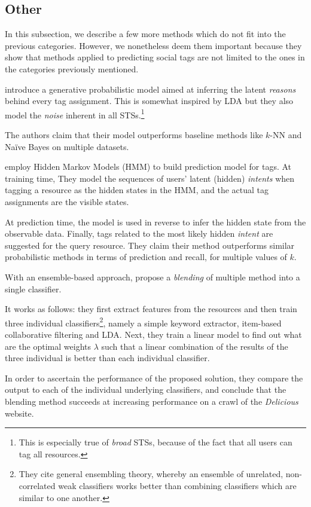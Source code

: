 \subsection{Other}

In this subsection, we describe a few more methods which do not fit into the previous categories. However, we nonetheless deem them important because they show that methods applied to predicting social tags are not limited to the ones in the categories previously mentioned. 

\cite{si_sun_2010} introduce a generative probabilistic model aimed at inferring the  latent \textit{reasons} behind every tag assignment. This is somewhat inspired by LDA but they also model the \textit{noise} inherent in all STSs.\footnote{This is especially true of \textit{broad} STSs, because of the fact that all users can tag all resources.}

The authors claim that their model outperforms baseline methods like $k$-NN and Naïve Bayes on multiple datasets.

\cite{trabelsi_etal_2012} employ Hidden Markov Models (HMM) \citep{rabiner_1989} to build prediction model for tags. At training time, They model the sequences of users' latent (hidden) \textit{intents} when tagging a resource as the hidden states in the HMM, and the actual tag assignments are the visible states.

At prediction time, the model is used in reverse to infer the hidden state from the observable data. Finally, tags related to the most likely hidden \textit{intent} are suggested for the query resource. They claim their method outperforms similar probabilistic methods in terms of prediction and recall, for multiple values of $k$.

With an ensemble-based approach, \cite{liu_etal_2013} propose a \textit{blending} of multiple method into a single classifier. 

It works as follows: they first extract features from the resources and then train three individual classifiers\footnote{They cite general ensembling theory, whereby an ensemble of unrelated, non-correlated weak classifiers works better than combining classifiers which are similar to one another.}, namely a simple keyword extractor, item-based collaborative filtering and LDA. Next, they train a linear model to find out what are the optimal weights $\lambda$ such that a linear combination of the results of the three individual is better than each individual classifier.

In order to ascertain the performance of the proposed solution, they compare the output to each of the individual underlying classifiers, and conclude that the blending method succeeds at increasing performance on a crawl of the \textit{Delicious} website.

